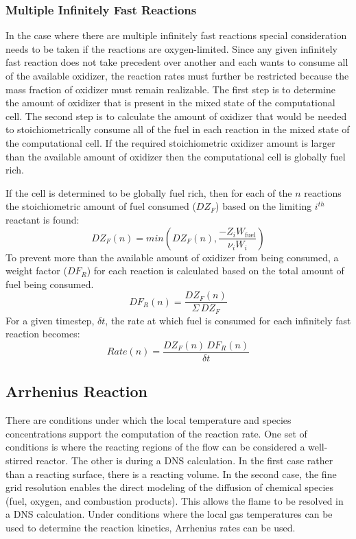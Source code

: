\subsubsection{Multiple Infinitely Fast Reactions}   
In the case where there are multiple infinitely fast reactions special consideration needs to be taken if the reactions are oxygen-limited. Since any given infinitely fast reaction does not take precedent over another and each wants to consume all of the available oxidizer, the reaction rates must further be restricted because the mass fraction of oxidizer must remain realizable. The first step is to determine the amount of oxidizer that is present in the mixed state of the computational cell. The second step is to calculate the amount of oxidizer that would be needed to stoichiometrically consume all of the fuel in each reaction in the mixed state of the computational cell. If the required stoichiometric oxidizer amount is larger than the available amount of oxidizer then the computational cell is globally fuel rich.

If the cell is determined to be globally fuel rich, then for each of the $n$ reactions the stoichiometric amount of fuel consumed ($DZ_F$) based on the limiting $i^{th}$ reactant is found:
\begin{equation}\label{eq:stoich_fuel}
DZ_F(n) = min\left (DZ_F(n),\frac{-Z_{i}W_{\mathrm{fuel}}}{\nu_{i}W_{i}}\right)
\end{equation}
To prevent more than the available amount of oxidizer from being consumed, a weight factor ($DF_{R}$) for each reaction is calculated based on the total amount of fuel being consumed.
\begin{equation}\label{eq:fuel_weight}
DF_R(n) = \frac{DZ_F(n)}{\Sigma \, DZ_F}
\end{equation}
For a given timestep, $\delta t$, the rate at which fuel is consumed for each infinitely fast reaction becomes:
\begin{equation}\label{eq:fuel_rate}
Rate(n) = \frac{DZ_F(n)\,DF_R(n)}{\delta t}
\end{equation}

\subsection{Arrhenius Reaction}
There are conditions under which the local temperature and species concentrations support the computation of the reaction rate.  One set of conditions is where the reacting regions of the flow can be considered a well-stirred reactor.  The other is during a DNS calculation.  In the first case rather than a reacting surface, there is a reacting volume.  In the second case, the fine grid resolution enables the direct modeling of the diffusion of chemical species (fuel,
oxygen, and combustion products).  This allows the flame to be resolved in a DNS calculation.  Under conditions where the local gas
temperatures can be used to determine the reaction kinetics, Arrhenius rates can be used.


